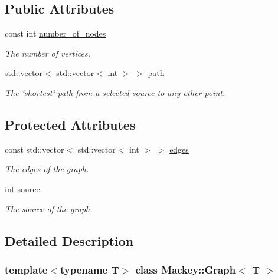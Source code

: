 \subsection*{Public Attributes}
\begin{DoxyCompactItemize}
\item 
const int \hyperlink{classMackey_1_1Graph_a870a7a373445fa2a8fc61bf51d39be9a}{number\+\_\+of\+\_\+nodes}
\begin{DoxyCompactList}\small\item\em The number of vertices. \end{DoxyCompactList}\item 
std\+::vector$<$ std\+::vector$<$ int $>$ $>$ \hyperlink{classMackey_1_1Graph_a66fac95e623ca6e3e85ec33310755831}{path}
\begin{DoxyCompactList}\small\item\em The \char`\"{}shortest\char`\"{} path from a selected source to any other point. \end{DoxyCompactList}\end{DoxyCompactItemize}
\subsection*{Protected Attributes}
\begin{DoxyCompactItemize}
\item 
const std\+::vector$<$ std\+::vector$<$ int $>$ $>$ \hyperlink{classMackey_1_1Graph_a0a2aeb9b16c5f0e583f360943b7f340f}{edges}
\begin{DoxyCompactList}\small\item\em The edges of the graph. \end{DoxyCompactList}\item 
int \hyperlink{classMackey_1_1Graph_a43657a07a21a2dcf422876400360ed5b}{source}
\begin{DoxyCompactList}\small\item\em The source of the graph. \end{DoxyCompactList}\end{DoxyCompactItemize}


\subsection{Detailed Description}
\subsubsection*{template$<$typename T$>$\newline
class Mackey\+::\+Graph$<$ T $>$}

